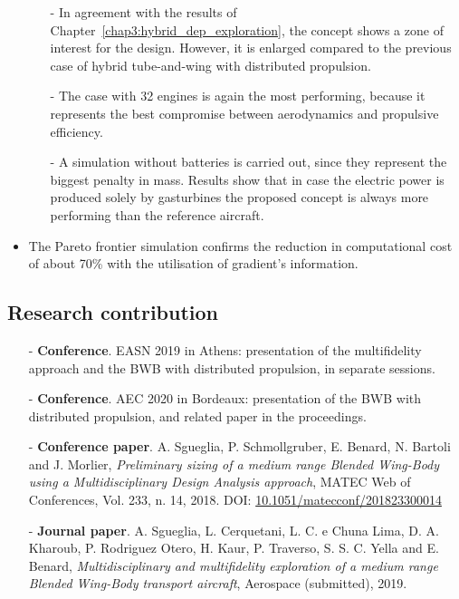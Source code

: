 \begin{mdframed}[hidealllines=true,backgroundcolor=blue!20]
\begin{itemize}
\begin{itemize}
			\item[-] In agreement with the results of Chapter~\ref{chap3:hybrid_dep_exploration}, the concept shows a zone of interest for the design. However, it is enlarged compared to the previous case of hybrid tube-and-wing with distributed propulsion. 
			
			\item[-] The case with 32 engines is again the most performing, because it represents the best compromise between aerodynamics and propulsive efficiency. 
			
			\item[-] A simulation without batteries is carried out, since they represent the biggest penalty in mass. Results show that in case the electric power is produced solely by gasturbines the proposed concept is always more performing than the reference aircraft.
			
		\end{itemize}
		
		\item The Pareto frontier simulation confirms the reduction in computational cost of about 70\% with the utilisation of gradient's information. 
		
	\end{itemize}
	
\end{mdframed}

\clearpage

\begin{mdframed}[hidealllines=true,backgroundcolor=green!20]
	\section*{Research contribution }
	
	\begin{itemize}
		\item[-] \textbf{Conference}. EASN 2019 in Athens: presentation of the multifidelity approach and the BWB with distributed propulsion, in separate sessions. 
		
		\item[-] \textbf{Conference}. AEC 2020 in Bordeaux: presentation of the BWB with distributed propulsion, and related paper in the proceedings. 
		
		\item[-] \textbf{Conference paper}. A. Sgueglia, P. Schmollgruber, E. Benard, N. Bartoli and J. Morlier, \emph{Preliminary sizing of a medium range Blended Wing-Body using a Multidisciplinary Design Analysis approach}, MATEC Web of Conferences, Vol. 233, n. 14, 2018. DOI: \url{10.1051/matecconf/201823300014}	
		
		\item[-] \textbf{Journal paper}. A. Sgueglia, L. Cerquetani, L. C. e Chuna Lima, D. A. Kharoub, P. Rodriguez Otero, H. Kaur, P. Traverso, S. S. C. Yella and E. Benard, \emph{Multidisciplinary and multifidelity exploration of a medium range Blended Wing-Body transport aircraft}, Aerospace (submitted), 2019.
		
	\end{itemize}
\end{mdframed}